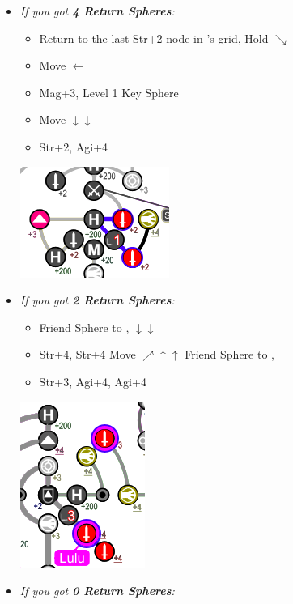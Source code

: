 \begin{spheregrid}
\begin{multicols}{2}
\begin{itemize}
\begin{itemize}
				\item \textit{If you got \textbf{4 Return Spheres}:}
				      \begin{itemize}
					      \item Return to the last Str+2 node in \wakka's grid, Hold $\searrow$
					      \item Move $\leftarrow$
					      \item Mag+3, Level 1 Key Sphere
					      \item Move $\downarrow\downarrow$
					      \item Str+2, Agi+4
				      \end{itemize}
				      \includegraphics[width=.5\columnwidth]{graphics/4_returns_1}
				\item \textit{If you got \textbf{2 Return Spheres}:}
				      \begin{itemize}
					      \item Friend Sphere to \lulu,  $\downarrow\downarrow$
					      \item Str+4, Str+4
					            \luluf Move $\nearrow\uparrow\uparrow$
					            \yunaf Friend Sphere to \lulu,
					      \item Str+3, Agi+4, Agi+4
				      \end{itemize}
				      \includegraphics[width=.4\columnwidth]{graphics/2_and_2}
				      \columnbreak
				\item \textit{If you got \textbf{0 Return Spheres}:}

\end{itemize}
\end{itemize}
\end{multicols}
\end{spheregrid}
